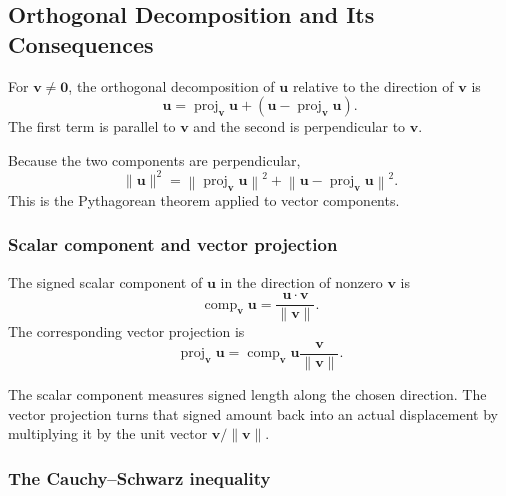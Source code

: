 \subsection{Orthogonal Decomposition and Its Consequences}

\begin{definitionbox}
For $\mathbf v\neq\mathbf0$, the orthogonal decomposition of $\mathbf u$ relative
to the direction of $\mathbf v$ is
\[
\boxed{
\mathbf u
=
\operatorname{proj}_{\mathbf v}\mathbf u
+
\left(\mathbf u-\operatorname{proj}_{\mathbf v}\mathbf u\right)
}.
\]
The first term is parallel to $\mathbf v$ and the second is perpendicular to
$\mathbf v$.
\end{definitionbox}

\begin{theorembox}
Because the two components are perpendicular,
\[
\boxed{
\|\mathbf u\|^2
=
\left\|\operatorname{proj}_{\mathbf v}\mathbf u\right\|^2
+
\left\|\mathbf u-\operatorname{proj}_{\mathbf v}\mathbf u\right\|^2
}.
\]
This is the Pythagorean theorem applied to vector components.
\end{theorembox}

\subsubsection*{Scalar component and vector projection}

\begin{definitionbox}
The signed scalar component of $\mathbf u$ in the direction of nonzero
$\mathbf v$ is
\[
\boxed{
\operatorname{comp}_{\mathbf v}\mathbf u
=
\frac{\mathbf u\cdot\mathbf v}{\|\mathbf v\|}
}.
\]
The corresponding vector projection is
\[
\boxed{
\operatorname{proj}_{\mathbf v}\mathbf u
=
\operatorname{comp}_{\mathbf v}\mathbf u
\frac{\mathbf v}{\|\mathbf v\|}
}.
\]
\end{definitionbox}

\begin{interpretationbox}
The scalar component measures signed length along the chosen direction. The
vector projection turns that signed amount back into an actual displacement by
multiplying it by the unit vector $\mathbf v/\|\mathbf v\|$.
\end{interpretationbox}

\subsubsection*{The Cauchy--Schwarz inequality}

